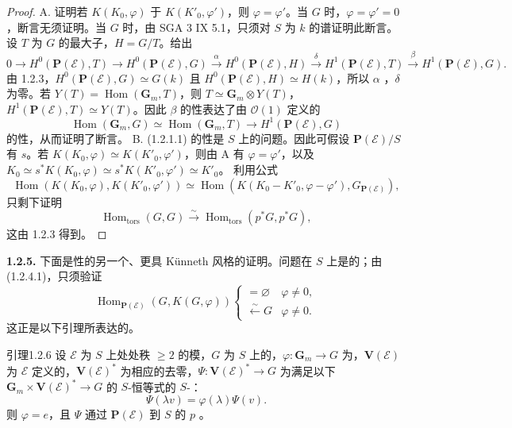 \begin{proof}
A. 证明若 $K(K_0,\varphi)$ 于 $K(K'_0,\varphi')$，则 $\varphi=\varphi'$。当 $G$ 时，$\varphi=\varphi'=0$，断言无须证明。当 $G$ 时，由 SGA 3 IX 5.1，只须对 $S$ 为 $k$ 的谱证明此断言。设 $T$ 为 $G$ 的最大子，$H=G/T$。给出
\[0\to H^0(\mathbf P(\mathscr E),T)\to H^0(\mathbf P(\mathscr E),G)\xrightarrow\alpha H^0(\mathbf P(\mathscr E),H)\xrightarrow\delta H^1(\mathbf P(\mathscr E),T)\xrightarrow\beta H^1(\mathbf P(\mathscr E),G).\]
由 1.2.3，$H^0(\mathbf P(\mathscr E),G)\simeq G(k)$ 且 $H^0(\mathbf P(\mathscr E),H)\simeq H(k)$，所以 $\alpha$ ，$\delta$ 为零。若 $Y(T)=\operatorname{Hom}(\mathbf G_m,T)$，则 $T\simeq\mathbf G_m\otimes Y(T)$，$H^1(\mathbf P(\mathscr E),T)\simeq Y(T)$。因此 $\beta$ 的性表达了由 $\mathscr O(1)$ 定义的
\[\operatorname{Hom}(\mathbf G_m,G)\simeq\operatorname{Hom}(\mathbf G_m,T)\longrightarrow H^1(\mathbf P(\mathscr E),G)\]
的性，从而证明了断言。
B.  (1.2.1.1) 的性是 $S$ 上的问题。因此可假设 $\mathbf P(\mathscr E)/S$ 有 $s$。若 $K(K_0,\varphi)\simeq K(K'_0,\varphi')$，则由 A 有 $\varphi=\varphi'$，以及
$K_0\simeq s^*K(K_0,\varphi)\simeq s^*K(K'_0,\varphi')\simeq K'_0$。
利用公式
\begin{equation}\operatorname{Hom}(K(K_0,\varphi),K(K'_0,\varphi'))\simeq\operatorname{Hom}(K(K_0-K'_0,\varphi-\varphi'),G_{\mathbf P(\mathscr E)}),\tag{1.2.4.1}\end{equation}
只剩下证明
\[\operatorname{Hom}_{\mathrm{tors}}(G,G)\xrightarrow\sim\operatorname{Hom}_{\mathrm{tors}}(p^*G,p^*G),\]
这由 1.2.3 得到。
\end{proof}
\textbf{1.2.5.} 下面是性的另一个、更具 Künneth 风格的证明。问题在 $S$ 上是的；由 (1.2.4.1)，只须验证
\[\operatorname{Hom}_{\mathbf P(\mathscr E)}(G,K(G,\varphi))\begin{cases}=\varnothing&\varphi\ne0,\\\xleftarrow\sim G&\varphi\ne0.\end{cases}\]
这正是以下引理所表达的。
\begin{SGAresult}{引理}{1.2.6}
设 $\mathscr E$ 为 $S$ 上处处秩 $\geq2$ 的模，$G$ 为 $S$ 上的，$\varphi:\mathbf G_m\to G$ 为，$\mathbf V(\mathscr E)$ 为 $\mathscr E$ 定义的，$\mathbf V(\mathscr E)^*$ 为相应的去零，$\Psi:\mathbf V(\mathscr E)^*\to G$ 为满足以下 $\mathbf G_m\times\mathbf V(\mathscr E)^*\to G$ 的 $S$-恒等式的 $S$-：
\[\Psi(\lambda v)=\varphi(\lambda)\Psi(v).\]
则 $\varphi=e$，且 $\Psi$ 通过 $\mathbf P(\mathscr E)$ 到 $S$ 的 $p$ 。
\end{SGAresult}
